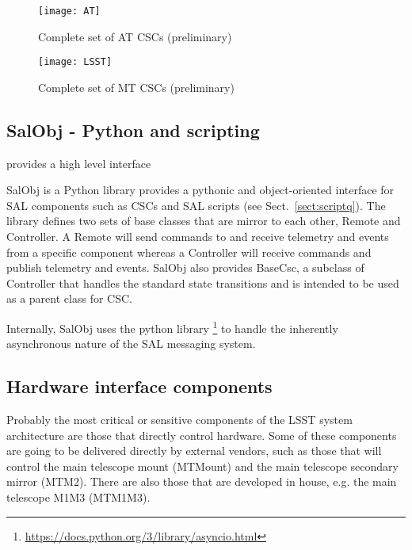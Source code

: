 \begin{figure}
\begin{center}
\texttt{[image: AT]}
\caption{Complete set of AT CSCs (preliminary)\label{fig:atcscs}}
\end{center}
\end{figure}

\begin{figure}
\begin{center}
\texttt{[image: LSST]}
\caption{Complete set of MT CSCs (preliminary)\label{fig:mtcscs}}
\end{center}
\end{figure}

\subsection{SalObj - Python and scripting }\label{sect:salobj}

provides a high level interface 

SalObj is a Python library provides a pythonic and object-oriented interface for SAL components such as CSCs and SAL 
scripts (see Sect.~\ref{sect:scriptq}). The library defines two sets of base classes that are mirror to each other, 
Remote and Controller. A Remote will send commands to and receive telemetry and events from a specific component whereas a 
Controller will receive commands and publish telemetry and events. SalObj also provides BaseCsc, a subclass of Controller 
that handles the standard state transitions and is intended to be used as a parent class for CSC.

Internally, SalObj uses the python library \asyncio\footnote{\url{https://docs.python.org/3/library/asyncio.html}} to handle the 
inherently asynchronous nature of the SAL messaging system.

\subsection{Hardware interface components}\label{sect:hardware_csc}
Probably the most critical or sensitive components of the LSST system architecture are those that directly control hardware. Some 
of these components are going to be delivered directly by external vendors, such as those that will control the main telescope 
mount (MTMount) and the main telescope secondary mirror (MTM2). There are also those that are developed in house, e.g. the 
main telescope M1M3 (MTM1M3).


